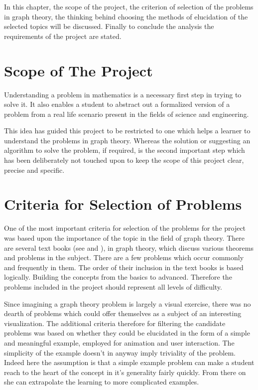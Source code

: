 
In this chapter, the scope of the project, the criterion of selection of the
problems in graph theory, the thinking behind choosing the methods of
elucidation of the selected topics will be discussed. Finally to conclude the analysis
the requirements of the project are stated.


\section{Scope of The Project}
\label{requirements: scope}
Understanding a problem in mathematics is a necessary first step in trying to solve it.
It also enables a student to abstract out a formalized version of a
problem from a real life scenario present in the fields of science and engineering.

This idea has guided this project to be restricted to one which helps a learner to
understand the problems in graph theory. Whereas the solution or suggesting an
algorithm to solve the problem, if required, is the second important step which
has been deliberately not touched upon to keep the scope of this project
clear, precise and specific.


\section{Criteria for Selection of Problems}
\label{section: selectionCriteria}
One of the most important criteria for selection of the problems for the
project was based upon the importance of the topic in the field of graph
theory. There are several text books (see \cite{Newman10} and
\cite{KleinbergTardos06}), in graph theory, which discuss various theorems and
problems in the subject.  There are a few problems which occur commonly and
frequently in them. The order of their inclusion in the text books is based
logically.  Building the concepts from the basics to advanced. Therefore the
problems included in the project should represent all levels of difficulty.

Since imagining a graph theory problem is largely a visual exercise, there
was no dearth of problems which could offer themselves as a subject of an
interesting visualization. The additional criteria therefore for filtering the
candidate problems was based on whether they could be elucidated in the form of a
simple and meaningful example, employed for animation and user
interaction. The simplicity of the example doesn't in anyway imply
triviality of the problem. Indeed here the assumption is that a simple example
problem can make a student reach to the heart of the concept in it's generality
fairly quickly. From there on she can extrapolate the learning to more
complicated examples.

